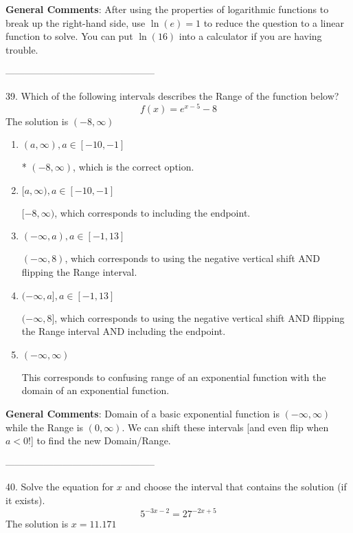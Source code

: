 \documentclass{extbook}[14pt]
\begin{document}
\textbf{General Comments}: After using the properties of logarithmic functions to break up the right-hand side, use $\ln(e) = 1$ to reduce the question to a linear function to solve. You can put $\ln(16)$ into a calculator if you are having trouble.

-----------------------------------------------

39. Which of the following intervals describes the Range of the function below?
\[ f(x) = e^{x-5}-8 \] 
The solution is $ (-8, \infty) $ 

\begin{enumerate}[label=\Alph*.] 
\item $ (a, \infty), a \in [-10, -1] $ 

 * $(-8, \infty)$, which is the correct option. 
\item $ [a, \infty), a \in [-10, -1] $ 

 $[-8, \infty)$, which corresponds to including the endpoint. 
\item $ (-\infty, a), a \in [-1, 13] $ 

 $(-\infty, 8)$, which corresponds to using the negative vertical shift AND flipping the Range interval. 
\item $ (-\infty, a], a \in [-1, 13] $ 

 $(-\infty, 8]$, which corresponds to using the negative vertical shift AND flipping the Range interval AND including the endpoint. 
\item $ (-\infty, \infty) $ 

 This corresponds to confusing range of an exponential function with the domain of an exponential function. 
\end{enumerate} 
 
\textbf{General Comments}: Domain of a basic exponential function is $(-\infty, \infty)$ while the Range is $(0, \infty)$. We can shift these intervals [and even flip when $a<0$!] to find the new Domain/Range.

-----------------------------------------------

40. Solve the equation for $x$ and choose the interval that contains the solution (if it exists).
\[ 5^{-3x-2} = 27^{-2x+5} \] 
The solution is $ x = 11.171 $ 
\end{document}
